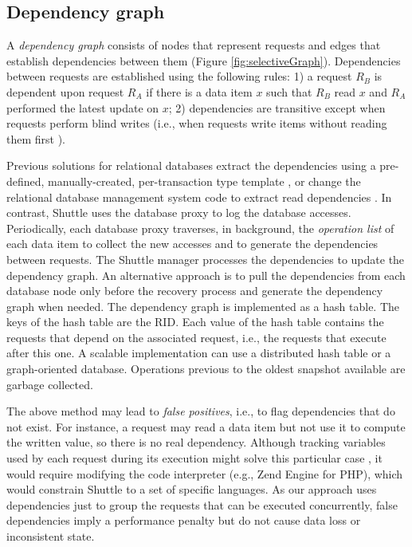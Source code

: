 \subsection{Dependency graph}
\label{sec:recovery:dependencies}

A \emph{dependency graph} consists of nodes that represent requests and edges that establish dependencies between them (Figure \ref{fig:selectiveGraph}). Dependencies between requests are established using the following rules: 1) a request $R_B$ is dependent upon request $R_A$ if there is a data item $x$ such that $R_B$ read $x$ and $R_A$ performed the latest update on $x$; 2) dependencies are transitive except when requests perform blind writes (i.e., when requests write items without reading them first \cite{itdb}). 

Previous solutions for relational databases extract the dependencies using a pre-defined, manually-created, per-transaction type template \cite{itdb}, or change the relational database management system code to extract read dependencies \cite{phoenix}. In contrast, Shuttle uses the database proxy to log the database accesses. Periodically, each database proxy traverses, in background, the \emph{operation list} of each data item to collect the new accesses and to generate the dependencies between requests. The Shuttle manager processes the dependencies to update the dependency graph. An alternative approach is to pull the dependencies from each database node only before the recovery process and generate the dependency graph when needed. The dependency graph is implemented as a hash table. The keys of the hash table are the \ac{RID}. Each value of the hash table contains the requests that depend on the associated request, i.e., the requests that execute after this one. A scalable implementation can use a distributed hash table or a graph-oriented database. Operations previous to the oldest snapshot available are garbage collected.

The above method may lead to \emph{false positives}, i.e., to flag dependencies that do not exist. For instance, a request may read a data item but not use it to compute the written value, so there is no real dependency. Although tracking variables used by each request during its execution might solve this particular case \cite{Akkus2010}, it would require modifying the code interpreter (e.g., Zend Engine for PHP), which would constrain Shuttle to a set of specific languages. As our approach uses dependencies just to group the requests that can be executed concurrently, false dependencies imply a performance penalty but do not cause data loss or inconsistent state.

